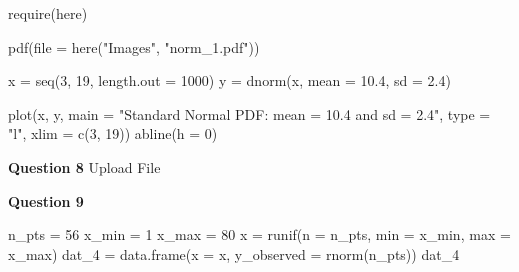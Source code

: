 \documentclass[
]{article}
\newenvironment{Shaded}{\begin{snugshade}}{\end{snugshade}}
\newcommand{\AttributeTok}[1]{\textcolor[rgb]{0.77,0.63,0.00}{#1}}
\newcommand{\DecValTok}[1]{\textcolor[rgb]{0.00,0.00,0.81}{#1}}
\newcommand{\FloatTok}[1]{\textcolor[rgb]{0.00,0.00,0.81}{#1}}
\newcommand{\FunctionTok}[1]{\textcolor[rgb]{0.00,0.00,0.00}{#1}}
\newcommand{\NormalTok}[1]{#1}
\newcommand{\OtherTok}[1]{\textcolor[rgb]{0.56,0.35,0.01}{#1}}
\newcommand{\StringTok}[1]{\textcolor[rgb]{0.31,0.60,0.02}{#1}}
\begin{document}
\begin{Shaded}
\begin{Highlighting}[]
\FunctionTok{require}\NormalTok{(here)}

\FunctionTok{pdf}\NormalTok{(}\AttributeTok{file =} \FunctionTok{here}\NormalTok{(}\StringTok{"Images"}\NormalTok{, }\StringTok{"norm\_1.pdf"}\NormalTok{))}

\NormalTok{x }\OtherTok{=} \FunctionTok{seq}\NormalTok{(}\DecValTok{3}\NormalTok{, }\DecValTok{19}\NormalTok{, }\AttributeTok{length.out =} \DecValTok{1000}\NormalTok{)}
\NormalTok{y }\OtherTok{=} \FunctionTok{dnorm}\NormalTok{(x, }\AttributeTok{mean =} \FloatTok{10.4}\NormalTok{, }\AttributeTok{sd =} \FloatTok{2.4}\NormalTok{)}

\FunctionTok{plot}\NormalTok{(x, y, }\AttributeTok{main =} \StringTok{"Standard Normal PDF: mean = 10.4 and sd = 2.4"}\NormalTok{, }\AttributeTok{type =} \StringTok{"l"}\NormalTok{, }\AttributeTok{xlim =} \FunctionTok{c}\NormalTok{(}\DecValTok{3}\NormalTok{, }\DecValTok{19}\NormalTok{))}
\FunctionTok{abline}\NormalTok{(}\AttributeTok{h =} \DecValTok{0}\NormalTok{)}
\end{Highlighting}
\end{Shaded}

\textbf{Question 8} Upload File

\textbf{Question 9}

\begin{Shaded}
\begin{Highlighting}[]
\NormalTok{n\_pts }\OtherTok{=} \DecValTok{56}
\NormalTok{x\_min }\OtherTok{=} \DecValTok{1}
\NormalTok{x\_max }\OtherTok{=} \DecValTok{80}
\NormalTok{x }\OtherTok{=} \FunctionTok{runif}\NormalTok{(}\AttributeTok{n =}\NormalTok{ n\_pts, }\AttributeTok{min =}\NormalTok{ x\_min, }\AttributeTok{max =}\NormalTok{ x\_max)}
\NormalTok{dat\_4 }\OtherTok{=} \FunctionTok{data.frame}\NormalTok{(}\AttributeTok{x =}\NormalTok{ x, }\AttributeTok{y\_observed =} \FunctionTok{rnorm}\NormalTok{(n\_pts))}
\NormalTok{dat\_4}
\end{Highlighting}
\end{Shaded}
\end{document}

